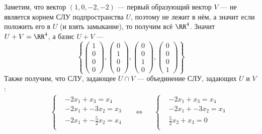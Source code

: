 \documentclass[12pt,a4paper]{article}
\begin{document}
\begin{enumproblem}[.1]
        Заметим, что вектор $(1, 0, -2, -2)$ --- первый образующий вектор $V$ --- не является корнем СЛУ подпространства $U$, поэтому не лежит в нём, а значит если положить его в $U$ (и взять замыкание), то получим всё $\RR^4$. Значит $U + V = \RR^4$, а базис $U + V$ ---
        \[
            \left\{
                \begin{pmatrix}
                    1 \\ 0 \\ 0 \\ 0
                \end{pmatrix},
                \begin{pmatrix}
                    0 \\ 1 \\ 0 \\ 0
                \end{pmatrix},
                \begin{pmatrix}
                    0 \\ 0 \\ 1 \\ 0
                \end{pmatrix},
                \begin{pmatrix}
                    0 \\ 0 \\ 0 \\ 1
                \end{pmatrix}
            \right\}
        \]
        Также получим, что СЛУ, задающее $U \cap V$ --- объединение СЛУ, задающих $U$ и $V$:
        \begin{align*}
            &&
            &\left\{
                \begin{aligned}
                    &-2 x_1 + x_3 = x_4\\
                    &-2 x_1 + -3 x_2 = x_3\\
                    &-2 x_1 + -\frac{5}{2} x_2 = x_4\\
                \end{aligned}
            \right.&
            &\Longleftrightarrow&
            &\left\{
                \begin{aligned}
                    &-2 x_1 + x_3 = x_4\\
                    &-2 x_1 + -3 x_2 = x_3\\
                    &\frac{5}{2} x_2 + x_3 = 0\\
                \end{aligned}

\end{align*}
\end{enumproblem}
\end{document}

